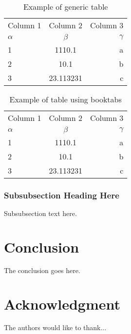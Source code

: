 \documentclass[a4paper,conference]{IEEEtran}
\begin{document}
\begin{table}[ht!]
  \begin{center}
    \caption{Example of generic table}
    \label{tab:table1}
    \begin{tabular}{@{}lcr@{}} %
      Column 1 & Column 2 & Column 3 \\
      $\alpha$ & $\beta$ & $\gamma$ \\
      \hline
      1 & 1110.1 & a\\
      2 & 10.1 & b\\
      3 & 23.113231 & c\\
    \end{tabular}
  \end{center}
\end{table}

\begin{table}[ht!]
  \begin{center}
    \caption{Example of table using booktabs}
    \label{tab:table1}
    \begin{tabular}{@{}lcr@{}}
      \toprule %
      Column 1 & Column 2 & Column 3 \\
      $\alpha$ & $\beta$ & $\gamma$ \\
      \midrule %
      1 & 1110.1 & a\\
      2 & 10.1 & b\\
      3 & 23.113231 & c\\
      \bottomrule %
    \end{tabular}
  \end{center}
\end{table}

\subsubsection{Subsubsection Heading Here}
Subsubsection text here.

\section{Conclusion}
The conclusion goes here.

\section*{Acknowledgment}

The authors would like to thank...
\end{document}
